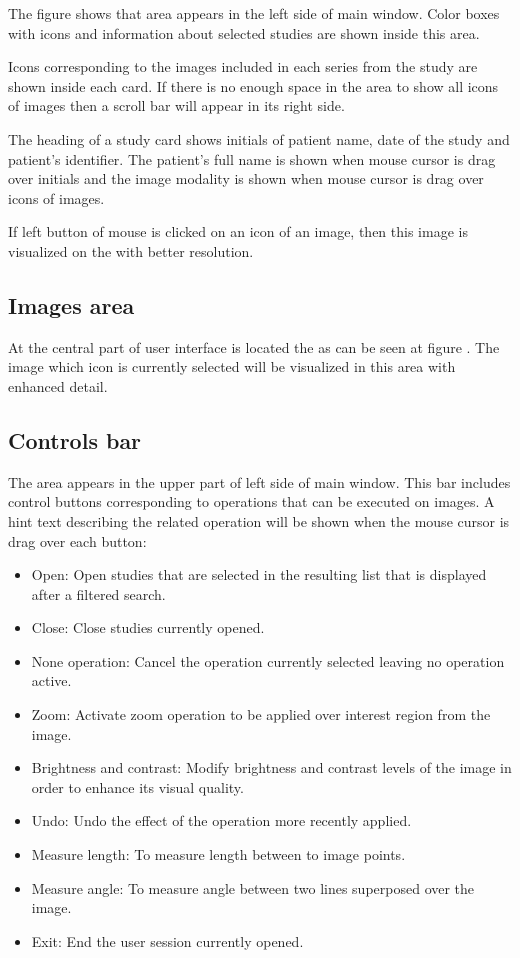 \documentclass{plantilla-manual-usuario-en}
\begin{document}
The figure  shows that  area appears in the left side of main window. Color boxes with icons and information about selected studies are shown inside this area.

Icons corresponding to the images included in each series from the study are shown inside each card. If there is no enough space in the  area to show all icons of images then a scroll bar will appear in its right side.

The heading of a study card shows initials of patient name, date of the study and patient's  identifier. The patient's full name is shown when mouse cursor is drag over initials and the image modality is shown when mouse cursor is drag over icons of images.

If left button of mouse is clicked on an icon of an image, then this image is visualized on the  with better resolution.

\subsection{Images area}

At the central part of user interface is located the  as can be seen at figure . The image which icon is currently selected will be visualized in this area with enhanced detail. 

\subsection{Controls bar}
The  area appears in the upper part of left side of main window. This bar includes control buttons corresponding to operations that can be executed on images. A hint text describing the related operation will be shown when the mouse cursor is drag over each button:

\begin{itemize}
\item Open: Open studies that are selected in the resulting list that is displayed after a filtered search.
\item Close: Close studies currently opened.
\item None operation: Cancel the operation currently selected leaving no operation active.
\item Zoom: Activate zoom operation to be applied over interest region from the image.
\item Brightness and contrast: Modify brightness and contrast levels of the image in order to enhance its visual quality.
\item Undo: Undo the effect of the operation more recently applied.
\item Measure length: To measure length between to image points. 
\item Measure angle: To measure angle between two lines superposed over the image. 
\item Exit: End the user session currently opened.
\end{itemize}
\end{document}

